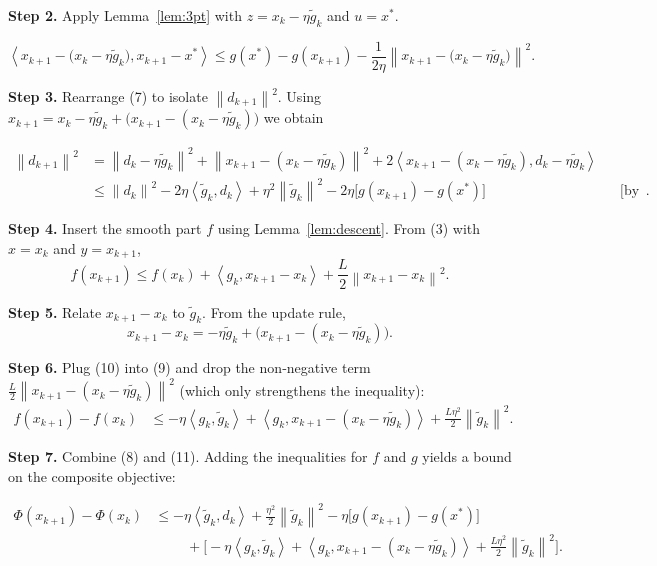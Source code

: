 \documentclass[11pt]{article}
\newcommand{\norm}[1]{\left\lVert #1\right\rVert}
\newcommand{\inner}[2]{\left\langle #1,#2\right\rangle}
\begin{document}
\noindent\textbf{Step 2.} Apply Lemma~\ref{lem:3pt} with $z=x_{k}-\eta\tilde g_{k}$ and $u=x^{*}$.  

\[
\inner{x_{k+1}-\bigl(x_{k}-\eta\tilde g_{k}\bigr)}{x_{k+1}-x^{*}}
\le g(x^{*})-g(x_{k+1})-\frac{1}{2\eta}\norm{x_{k+1}-\bigl(x_{k}-\eta\tilde g_{k}\bigr)}^{2}.
\tag{7}
\]

\noindent\textbf{Step 3.} Rearrange (7) to isolate $\norm{d_{k+1}}^{2}$. Using $x_{k+1}=x_{k}-\eta\tilde g_{k}+ \bigl(x_{k+1}-(x_{k}-\eta\tilde g_{k})\bigr)$ we obtain  

\[
\begin{aligned}
\norm{d_{k+1}}^{2}
&= \norm{d_{k}-\eta\tilde g_{k}}^{2}
   +\norm{x_{k+1}-(x_{k}-\eta\tilde g_{k})}^{2}
   +2\inner{x_{k+1}-(x_{k}-\eta\tilde g_{k})}{d_{k}-\eta\tilde g_{k}} \\[4pt]
&\le \norm{d_{k}}^{2}-2\eta\inner{\tilde g_{k}}{d_{k}}
      +\eta^{2}\norm{\tilde g_{k}}^{2}
      -2\eta\bigl[g(x_{k+1})-g(x^{*})\bigr]                     &&\text{[by (7)]}.
\end{aligned}
\tag{8}
\]

\noindent\textbf{Step 4.} Insert the smooth part $f$ using Lemma~\ref{lem:descent}.  
From (3) with $x=x_{k}$ and $y=x_{k+1}$,
\[
f(x_{k+1})\le f(x_{k})+\inner{g_{k}}{x_{k+1}-x_{k}}+\frac{L}{2}\norm{x_{k+1}-x_{k}}^{2}.
\tag{9}
\]

\noindent\textbf{Step 5.} Relate $x_{k+1}-x_{k}$ to $\tilde g_{k}$.
From the update rule,
\[
x_{k+1}-x_{k}= -\eta\tilde g_{k}+ \bigl(x_{k+1}-(x_{k}-\eta\tilde g_{k})\bigr).
\tag{10}
\]

\noindent\textbf{Step 6.} Plug (10) into (9) and drop the non‑negative term $\frac{L}{2}\norm{x_{k+1}-(x_{k}-\eta\tilde g_{k})}^{2}$ (which only strengthens the inequality):
\[
\begin{aligned}
f(x_{k+1})-f(x_{k})
&\le -\eta\inner{g_{k}}{\tilde g_{k}}
   +\inner{g_{k}}{x_{k+1}-(x_{k}-\eta\tilde g_{k})}
   +\frac{L\eta^{2}}{2}\norm{\tilde g_{k}}^{2}. \tag{11}
\end{aligned}
\]

\noindent\textbf{Step 7.} Combine (8) and (11). Adding the inequalities for $f$ and $g$ yields a bound on the composite objective:

\[
\begin{aligned}
\Phi(x_{k+1})-\Phi(x_{k})
&\le -\eta\inner{\tilde g_{k}}{d_{k}}
   +\frac{\eta^{2}}{2}\norm{\tilde g_{k}}^{2}
   -\eta\bigl[g(x_{k+1})-g(x^{*})\bigr]        \\[2pt]
&\qquad\;+\bigl[-\eta\inner{g_{k}}{\tilde g_{k}}
   +\inner{g_{k}}{x_{k+1}-(x_{k}-\eta\tilde g_{k})}
   +\frac{L\eta^{2}}{2}\norm{\tilde g_{k}}^{2}\bigr]. \tag{12}
\end{aligned}
\]
\end{document}
